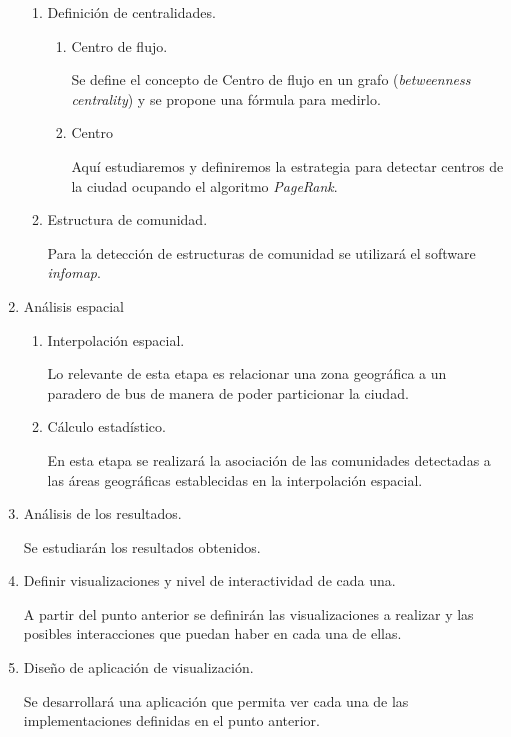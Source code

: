 \documentclass[itshape,12pt]{article}
\begin{document}
\begin{enumerate}
\begin{enumerate}
              \item Definición de centralidades.
              \begin{enumerate}
          \item Centro de flujo.

              Se define el concepto de Centro de flujo en un grafo (\textit{betweenness centrality}) y se propone una fórmula para medirlo.

              \item Centro

              Aquí estudiaremos y definiremos la estrategia para detectar centros de la ciudad ocupando el algoritmo \textit{PageRank}.

              \end{enumerate}
          \item Estructura de comunidad.

              Para la detección de estructuras de comunidad se utilizará el software \textit{infomap}. 
              \end{enumerate}
          \item Análisis espacial
              \begin{enumerate}
          \item Interpolación espacial.

              Lo relevante de esta etapa es relacionar una zona geográfica a un paradero de bus de manera de poder particionar la ciudad.

              \item Cálculo estadístico.

              En esta etapa se realizará la asociación de las comunidades detectadas a las áreas geográficas establecidas en la interpolación espacial.

              \end{enumerate}
          \item Análisis de los resultados.

              Se estudiarán los resultados obtenidos.

              \item Definir visualizaciones y nivel de interactividad de cada una.

              A partir del punto anterior se definirán las visualizaciones a realizar y las posibles interacciones que puedan haber en cada una de ellas.

              \item Diseño de aplicación de visualización.

              Se desarrollará una aplicación que permita ver cada una de las implementaciones definidas en el punto anterior.

              \end{enumerate}
\end{document}
